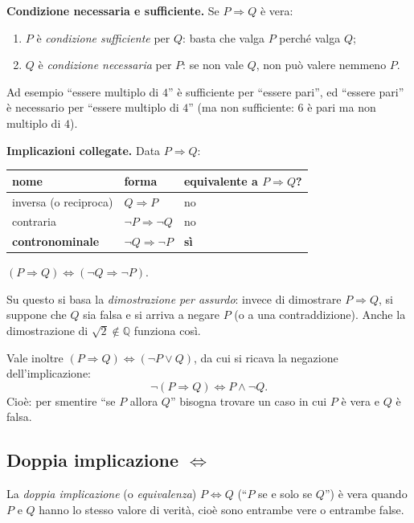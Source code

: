 \documentclass[11pt,a4paper]{article}
\theoremstyle{definition}
\begin{document}
\textbf{Condizione necessaria e sufficiente.} Se $P \Rightarrow Q$ è vera:
\begin{enumerate}
    \item $P$ è \emph{condizione sufficiente} per $Q$: basta che valga $P$
          perché valga $Q$;
    \item $Q$ è \emph{condizione necessaria} per $P$: se non vale $Q$, non
          può valere nemmeno $P$.
\end{enumerate}
Ad esempio ``essere multiplo di $4$'' è sufficiente per ``essere pari'', ed
``essere pari'' è necessario per ``essere multiplo di $4$'' (ma non
sufficiente: $6$ è pari ma non multiplo di $4$).

\textbf{Implicazioni collegate.} Data $P \Rightarrow Q$:
\begin{center}
\begin{tabular}{l|l|l}
nome & forma & equivalente a $P \Rightarrow Q$? \\ \hline
inversa (o reciproca) & $Q \Rightarrow P$ & no \\
contraria & $\neg P \Rightarrow \neg Q$ & no \\
\textbf{contronominale} & $\neg Q \Rightarrow \neg P$ & \textbf{sì}
\end{tabular}
\end{center}

\begin{teorema}[Contronominale]
$(P \Rightarrow Q) \iff (\neg Q \Rightarrow \neg P)$.
\end{teorema}

Su questo si basa la \emph{dimostrazione per assurdo}: invece di dimostrare
$P \Rightarrow Q$, si suppone che $Q$ sia falsa e si arriva a negare $P$
(o a una contraddizione). Anche la dimostrazione di $\sqrt{2} \notin
\mathbb{Q}$ funziona così.

Vale inoltre $(P \Rightarrow Q) \iff (\neg P \lor Q)$, da cui si ricava la
negazione dell'implicazione:
\[
\neg(P \Rightarrow Q) \iff P \land \neg Q.
\]
Cioè: per smentire ``se $P$ allora $Q$'' bisogna trovare un caso in cui
$P$ è vera e $Q$ è falsa.

\subsection{Doppia implicazione $\Leftrightarrow$}

\begin{definizione}
La \emph{doppia implicazione} (o \emph{equivalenza}) $P \Leftrightarrow Q$
(``$P$ se e solo se $Q$'') è vera quando $P$ e $Q$ hanno lo stesso valore
di verità, cioè sono entrambe vere o entrambe false.
\end{definizione}
\end{document}
